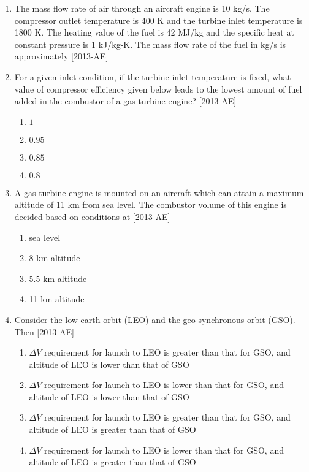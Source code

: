 \documentclass[journal,12pt,onecolumn]{IEEEtran}
\theoremstyle{remark}
\begin{document}
\begin{enumerate}
    \item The mass flow rate of air through an aircraft engine is 10 kg/s. The compressor outlet temperature is 400 K and the turbine inlet temperature is 1800 K. The heating value of the fuel is 42 MJ/kg and the specific heat at constant pressure is 1 kJ/kg-K. The mass flow rate of the fuel in kg/s is approximately \underline{\hspace{2cm}} \hfill{[2013-AE]}

    \item For a given inlet condition, if the turbine inlet temperature is fixed, what value of compressor efficiency given below leads to the lowest amount of fuel added in the combustor of a gas turbine engine? \hfill{[2013-AE]}
    \begin{enumerate}
        \item $1$
        \item $0.95$
        \item $0.85$
        \item $0.8$
    \end{enumerate}

    \item A gas turbine engine is mounted on an aircraft which can attain a maximum altitude of 11 km from sea level. The combustor volume of this engine is decided based on conditions at  \hfill{[2013-AE]}
    \begin{enumerate}
        \item sea level
        \item 8 km altitude
        \item 5.5 km altitude
        \item 11 km altitude
    \end{enumerate}

    \item Consider the low earth orbit (LEO) and the geo synchronous orbit (GSO). Then  \hfill{[2013-AE]}

    \begin{enumerate}
        \item $\Delta V$ requirement for launch to LEO is greater than that for GSO, and altitude of LEO is lower than that of GSO 
        \item $\Delta V$ requirement for launch to LEO is lower than that for GSO, and altitude of LEO is lower than that of GSO         
        \item $\Delta V$ requirement for launch to LEO is greater than that for GSO, and altitude of LEO is greater than that of GSO 
        \item $\Delta V$ requirement for launch to LEO is lower than that for GSO, and altitude of LEO is greater than that of GSO         
    \end{enumerate}


\end{enumerate}
\end{document}
